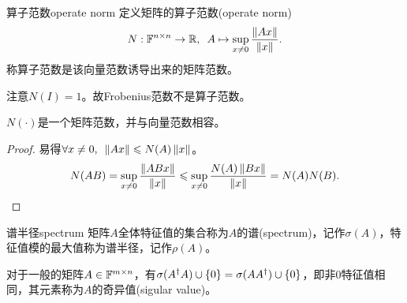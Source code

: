\begin{definition}
    {算子范数}{operate norm}
    定义矩阵的算子范数(operate norm)
    \begin{equation}
        N:\mathbb F^{n\times n}\to\mathbb R,\enspace A\mapsto\sup_{x\neq 0}\frac{\left\lVert Ax\right\rVert}{\left\lVert x\right\rVert}.
    \end{equation}
    称算子范数是该向量范数诱导出来的矩阵范数。
\end{definition}

\begin{remark}
    注意$N(I)=1$。故Frobenius范数不是算子范数。
\end{remark}

\begin{theorem}
    {}{}
    $N(\cdot)$是一个矩阵范数，并与向量范数相容。 
\end{theorem}

\begin{proof}
    易得$\forall x\neq 0,\enspace\left\lVert Ax\right\rVert\leqslant N(A)\left\lVert x\right\rVert$。
    \[
        N(AB)=\sup_{x\neq 0}\frac{\left\lVert ABx\right\rVert}{\left\lVert x\right\rVert}\leqslant\sup_{x\neq 0}\frac{N(A)\left\lVert Bx\right\rVert}{\left\lVert x\right\rVert}=N(A)N(B).
        \qedhere
    \]
\end{proof}

\begin{definition}
    {谱半径}{spectrum}
    矩阵$A$全体特征值的集合称为$A$的谱(spectrum)，记作$\sigma(A)$，特征值模的最大值称为谱半径，记作$\rho(A)$。
\end{definition}

\begin{remark}
    对于一般的矩阵$A\in\mathbb F^{m\times n}$，有$\sigma(A^\dagger A)\cup\{0\}=\sigma(AA^\dagger)\cup\{0\}$，即非0特征值相同，其元素称为$A$的奇异值(sigular value)。
\end{remark}

